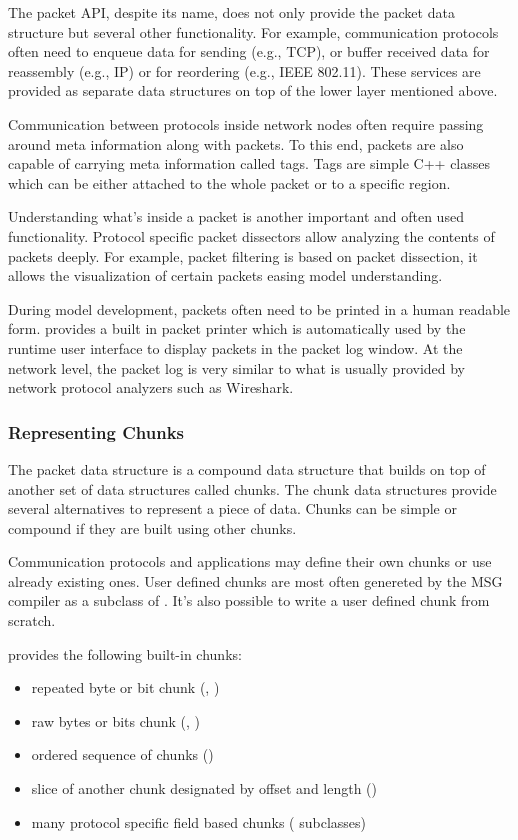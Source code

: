 The packet API, despite its name, does not only provide the packet data structure but several other functionality. For example, communication protocols often need to enqueue data for sending (e.g., TCP), or buffer received data for reassembly (e.g., IP) or for reordering (e.g., IEEE 802.11). These services are provided as separate data structures on top of the lower layer mentioned above.

Communication between protocols inside network nodes often require passing around meta information along with packets. To this end, packets are also capable of carrying meta information called tags. Tags are simple C++ classes which can be either attached to the whole packet or to a specific region.

Understanding what's inside a packet is another important and often used functionality. Protocol specific packet dissectors allow analyzing the contents of packets deeply. For example, packet filtering is based on packet dissection, it allows the visualization of certain packets easing model understanding.

During model development, packets often need to be printed in a human readable form. \inet provides a built in packet printer which is automatically used by the \omnet runtime user interface to display packets in the packet log window. At the network level, the packet log is very similar to what is usually provided by network protocol analyzers such as Wireshark.

\subsubsection*{Representing Chunks}
The packet data structure is a compound data structure that builds on top of another set of data structures called chunks. The chunk data structures provide several alternatives to represent a piece of data. Chunks can be simple or compound if they are built using other chunks.

Communication protocols and applications may define their own chunks or use already existing ones. User defined chunks are most often genereted by the \omnet MSG compiler as a subclass of . It's also possible to write a user defined chunk from scratch.

\inet provides the following built-in chunks:

\begin{itemize}
	\item	repeated byte or bit chunk (, )
	\item	raw bytes or bits chunk (, )
	\item	ordered sequence of chunks ()
	\item	slice of another chunk designated by offset and length ()
	\item	many protocol specific field based chunks ( subclasses)
\end{itemize}

